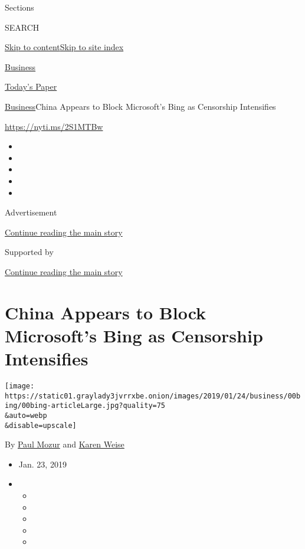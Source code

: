Sections

SEARCH

\protect\hyperlink{site-content}{Skip to
content}\protect\hyperlink{site-index}{Skip to site index}

\href{https://www.nytimes3xbfgragh.onion/section/business}{Business}

\href{https://myaccount.nytimes3xbfgragh.onion/auth/login?response_type=cookie\&client_id=vi}{}

\href{https://www.nytimes3xbfgragh.onion/section/todayspaper}{Today's
Paper}

\href{/section/business}{Business}\textbar{}China Appears to Block
Microsoft's Bing as Censorship Intensifies

\href{https://nyti.ms/2S1MTBw}{https://nyti.ms/2S1MTBw}

\begin{itemize}
\item
\item
\item
\item
\item
\end{itemize}

Advertisement

\protect\hyperlink{after-top}{Continue reading the main story}

Supported by

\protect\hyperlink{after-sponsor}{Continue reading the main story}

\hypertarget{china-appears-to-block-microsofts-bing-as-censorship-intensifies}{%
\section{China Appears to Block Microsoft's Bing as Censorship
Intensifies}\label{china-appears-to-block-microsofts-bing-as-censorship-intensifies}}

\texttt{[image: https://static01.graylady3jvrrxbe.onion/images/2019/01/24/business/00bing/00bing-articleLarge.jpg?quality=75\\\&auto=webp\\\&disable=upscale]}

By \href{https://www.nytimes3xbfgragh.onion/by/paul-mozur}{Paul Mozur}
and \href{https://www.nytimes3xbfgragh.onion/by/karen-weise}{Karen
Weise}

\begin{itemize}
\item
  Jan. 23, 2019
\item
  \begin{itemize}
  \item
  \item
  \item
  \item
  \item
  \end{itemize}
\end{itemize}

